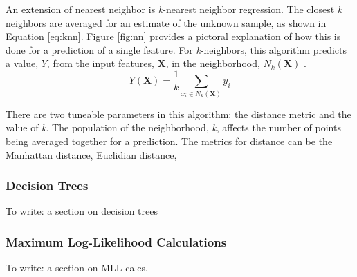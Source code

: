 An extension of nearest neighbor is \textit{k}-nearest neighbor regression.
The closest \textit{k} neighbors are averaged for an estimate of the unknown
sample, as shown in Equation \ref{eq:knn}.  Figure \ref{fig:nn} provides a
pictoral explanation of how this is done for a prediction of a single feature.
For \textit{k}-neighbors, this algorithm predicts a value, $Y$, from the input
features, $\boldsymbol{X}$, in the neighborhood, $N_k (\boldsymbol{X})$
\cite{elements_stats}. 
\begin{equation}
  Y(\boldsymbol{X}) = \frac{1}{k} \sum_{x_i \in N_k(\boldsymbol{X})} y_i
  \label{eq:knn}
\end{equation}

There are two tuneable parameters in this algorithm: the distance metric and
the value of \textit{k}.  The population of the neighborhood, \textit{k},
affects the number of points being averaged together for a prediction.  The
metrics for distance can be the Manhattan distance, Euclidian distance, 

\subsubsection{Decision Trees}
To write: a section on decision trees

\subsubsection{Maximum Log-Likelihood Calculations}
To write: a section on \gls{MLL} calcs.

